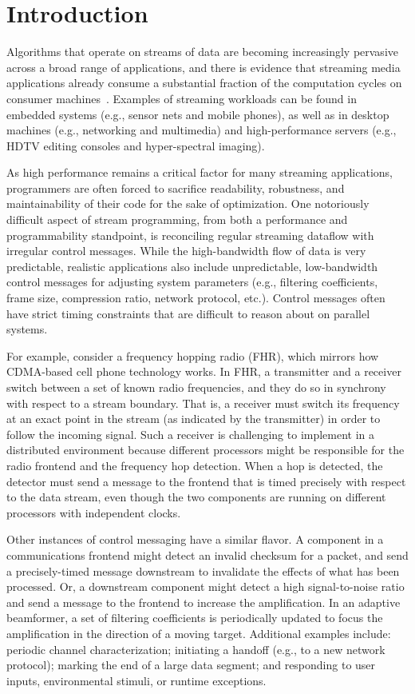 \section{Introduction}

Algorithms that operate on streams of data are becoming increasingly
pervasive across a broad range of applications, and there is evidence
that streaming media applications already consume a substantial
fraction of the computation cycles on consumer
machines~\cite{conte97,dief97,kirkpatrick97,Rix98}.  Examples of
streaming workloads can be found in embedded systems (e.g., sensor
nets and mobile phones), as well as in desktop machines (e.g.,
networking and multimedia) and high-performance servers (e.g., HDTV
editing consoles and hyper-spectral imaging).

As high performance remains a critical factor for many streaming
applications, programmers are often forced to sacrifice readability,
robustness, and maintainability of their code for the sake of
optimization.  One notoriously difficult aspect of stream programming,
from both a performance and programmability standpoint, is reconciling
regular streaming dataflow with irregular control messages.  While the
high-bandwidth flow of data is very predictable, realistic
applications also include unpredictable, low-bandwidth control
messages for adjusting system parameters (e.g., filtering
coefficients, frame size, compression ratio, network protocol, etc.).
Control messages often have strict timing constraints that are
difficult to reason about on parallel systems.

For example, consider a frequency hopping radio (FHR), which mirrors
how CDMA-based cell phone technology works.  In FHR, a transmitter and
a receiver switch between a set of known radio frequencies, and they
do so in synchrony with respect to a stream boundary. That is, a
receiver must switch its frequency at an exact point in the stream (as
indicated by the transmitter) in order to follow the incoming signal.
Such a receiver is challenging to implement in a distributed
environment because different processors might be responsible for the
radio frontend and the frequency hop detection.  When a hop is
detected, the detector must send a message to the frontend that is
timed precisely with respect to the data stream, even though the two
components are running on different processors with independent
clocks.

Other instances of control messaging have a similar flavor.  A
component in a communications frontend might detect an invalid
checksum for a packet, and send a precisely-timed message downstream
to invalidate the effects of what has been processed.  Or, a
downstream component might detect a high signal-to-noise ratio and
send a message to the frontend to increase the amplification.  In an
adaptive beamformer, a set of filtering coefficients is periodically
updated to focus the amplification in the direction of a moving
target.  Additional examples include: periodic channel
characterization; initiating a handoff (e.g., to a new network
protocol); marking the end of a large data segment; and responding to
user inputs, environmental stimuli, or runtime exceptions.

